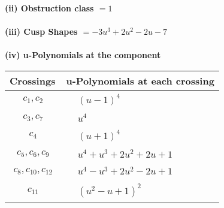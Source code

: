\documentclass[1p]{elsarticle_modified}
\theoremstyle{definition}
\begin{document}
\flushleft \textbf{(ii) Obstruction class $= 1$}\\~\\
\flushleft \textbf{(iii) Cusp Shapes $= -3 u^3+2 u^2-2 u-7$}\\~\\
\newpage\renewcommand{\arraystretch}{1}
\flushleft \textbf{(iv) u-Polynomials at the component}\newline \\
\begin{tabular}{m{50pt}|m{274pt}}
Crossings & \hspace{64pt}u-Polynomials at each crossing \\
\hline $$\begin{aligned}c_{1},c_{2}\end{aligned}$$&$\begin{aligned}
&(u-1)^4
\end{aligned}$\\
\hline $$\begin{aligned}c_{3},c_{7}\end{aligned}$$&$\begin{aligned}
&u^4
\end{aligned}$\\
\hline $$\begin{aligned}c_{4}\end{aligned}$$&$\begin{aligned}
&(u+1)^4
\end{aligned}$\\
\hline $$\begin{aligned}c_{5},c_{6},c_{9}\end{aligned}$$&$\begin{aligned}
&u^4+u^3+2 u^2+2 u+1
\end{aligned}$\\
\hline $$\begin{aligned}c_{8},c_{10},c_{12}\end{aligned}$$&$\begin{aligned}
&u^4- u^3+2 u^2-2 u+1
\end{aligned}$\\
\hline $$\begin{aligned}c_{11}\end{aligned}$$&$\begin{aligned}
&(u^2- u+1)^2
\end{aligned}$\\
\hline
\end{tabular}\\~\\
\end{document}
